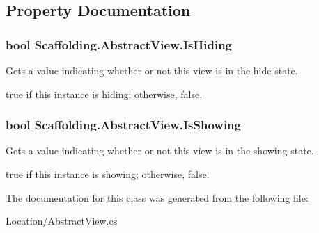 \subsection{Property Documentation}
\hypertarget{class_scaffolding_1_1_abstract_view_a162a5103cff0b5aa7938715e1a84ad61}{
\subsubsection[{Is\-Hiding}]{\setlength{\rightskip}{0pt plus 5cm}bool Scaffolding.\-Abstract\-View.\-Is\-Hiding\hspace{0.3cm}{\ttfamily [get]}}}\label{class_scaffolding_1_1_abstract_view_a162a5103cff0b5aa7938715e1a84ad61}


Gets a value indicating whether or not this view is in the hide state. 

{\ttfamily true} if this instance is hiding; otherwise, {\ttfamily false}.\hypertarget{class_scaffolding_1_1_abstract_view_ac933ea22f4d4b9e511f872d53d37a544}{
\subsubsection[{Is\-Showing}]{\setlength{\rightskip}{0pt plus 5cm}bool Scaffolding.\-Abstract\-View.\-Is\-Showing\hspace{0.3cm}{\ttfamily [get]}}}\label{class_scaffolding_1_1_abstract_view_ac933ea22f4d4b9e511f872d53d37a544}


Gets a value indicating whether or not this view is in the showing state. 

{\ttfamily true} if this instance is showing; otherwise, {\ttfamily false}.

The documentation for this class was generated from the following file\-:\begin{DoxyCompactItemize}
\item 
Location/Abstract\-View.\-cs\end{DoxyCompactItemize}

